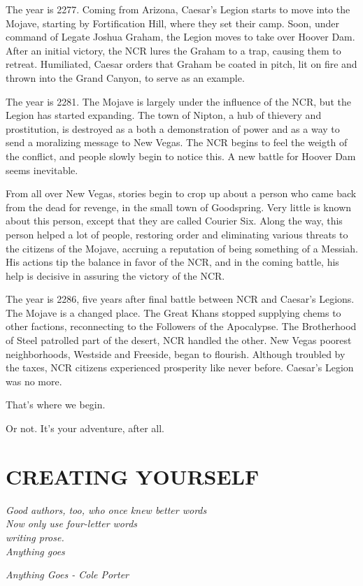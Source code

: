 \documentclass[11pt]{article} %
\begin{document}
The year is 2277. Coming from Arizona, Caesar's Legion starts to move into the Mojave, starting by Fortification Hill, where they set their camp. Soon, under command of Legate Joshua Graham, the Legion moves to take over Hoover Dam. After an initial victory, the NCR lures the Graham to a trap, causing them to retreat. Humiliated, Caesar orders that Graham be coated in pitch, lit on fire and thrown into the Grand Canyon, to serve as an example. 

The year is 2281. The Mojave is largely under the influence of the NCR, but the Legion has started expanding. The town of Nipton, a hub of thievery and prostitution, is destroyed as a both a demonstration of power and as a way to send a moralizing message to New Vegas. The NCR begins to feel the weigth of the conflict, and people slowly begin to notice this. A new battle for Hoover Dam seems inevitable. 

From all over New Vegas, stories begin to crop up about a person who came back from the dead for revenge, in the small town of Goodspring. Very little is known about this person, except that they are called Courier Six. Along the way, this person helped a lot of people, restoring order and eliminating various threats to the citizens of the Mojave, accruing a reputation of being something of a Messiah. His actions tip the balance in favor of the NCR, and in the coming battle, his help is decisive in assuring the victory of the NCR.

The year is 2286, five years after final battle between NCR and Caesar's Legions. The Mojave is a changed place. The Great Khans stopped supplying chems to other factions, reconnecting to the Followers of the Apocalypse. The Brotherhood of Steel patrolled part of the desert, NCR handled the other. New Vegas poorest neighborhoods, Westside and Freeside, began to flourish. Although troubled by the taxes, NCR citizens experienced prosperity like never before. Caesar's Legion was no more.

That's where we begin.

\newpage
Or not. It's your adventure, after all.
\newpage

\section{CREATING YOURSELF}

\epigraph{\textit{Good authors, too, who once knew better words \\
Now only use four-letter words \\
writing prose. \\
Anything goes}}{\textit{Anything Goes - Cole Porter}}
\end{document}
